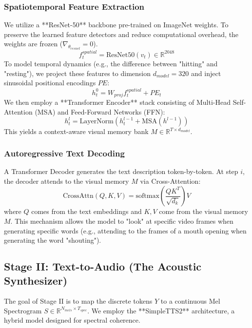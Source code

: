\documentclass[conference, onecolumn]{IEEEtran}
\begin{document}
\subsubsection{Spatiotemporal Feature Extraction}
We utilize a **ResNet-50** backbone pre-trained on ImageNet weights. To preserve the learned feature detectors and reduce computational overhead, the weights are frozen ($\nabla_{\theta_{resnet}} = 0$).
\[
f_t^{spatial} = \text{ResNet50}(v_t) \in \mathbb{R}^{2048}
\]
To model temporal dynamics (e.g., the difference between "hitting" and "resting"), we project these features to dimension $d_{model}=320$ and inject sinusoidal positional encodings $PE$:
\[
h_t^0 = W_{proj} f_t^{spatial} + PE_t
\]
We then employ a **Transformer Encoder** stack consisting of Multi-Head Self-Attention (MSA) and Feed-Forward Networks (FFN):
\[
h_t^l = \text{LayerNorm}(h_t^{l-1} + \text{MSA}(h^{l-1}))
\]
This yields a context-aware visual memory bank $M \in \mathbb{R}^{T \times d_{model}}$.

\subsubsection{Autoregressive Text Decoding}
A Transformer Decoder generates the text description token-by-token. At step $i$, the decoder attends to the visual memory $M$ via Cross-Attention:
\[
\text{CrossAttn}(Q, K, V) = \text{softmax}\left(\frac{Q K^T}{\sqrt{d_k}}\right)V
\]
where $Q$ comes from the text embeddings and $K, V$ come from the visual memory $M$. This mechanism allows the model to "look" at specific video frames when generating specific words (e.g., attending to the frames of a mouth opening when generating the word "shouting").

\subsection{Stage II: Text-to-Audio (The Acoustic Synthesizer)}
The goal of Stage II is to map the discrete tokens $Y$ to a continuous Mel Spectrogram $S \in \mathbb{R}^{N_{mels} \times T_{spec}}$. We employ the **SimpleTTS2** architecture, a hybrid model designed for spectral coherence.
\end{document}
